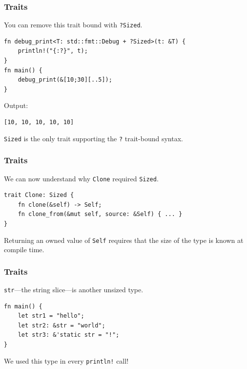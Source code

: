 \begin{frame}[fragile]
    \frametitle{Traits}
    You can remove this trait bound with \texttt{?Sized}.
    \pause
    \vfill
    \begin{verbatim}
fn debug_print<T: std::fmt::Debug + ?Sized>(t: &T) {
    println!("{:?}", t);
}
fn main() {
    debug_print(&[10;30][..5]);
}
    \end{verbatim}
    \vfill
    Output:
    \pause
    \begin{verbatim}
[10, 10, 10, 10, 10]
    \end{verbatim}
    \pause
    \vfill
    \texttt{Sized} is the only trait supporting the \texttt{?} trait-bound syntax.
\end{frame}

\begin{frame}[fragile]
    \frametitle{Traits}
    We can now understand why \texttt{Clone} required \texttt{Sized}.
    \pause
    \vfill
    \begin{verbatim}
trait Clone: Sized {
    fn clone(&self) -> Self;
    fn clone_from(&mut self, source: &Self) { ... }
}
    \end{verbatim}
    \pause
    \vfill
    Returning an owned value of \texttt{Self} requires that the size of the type is known at compile time.
\end{frame}

\begin{frame}[fragile]
    \frametitle{Traits}
    \texttt{str}---the string slice---is another unsized type.
    \pause
    \vfill
    \begin{verbatim}
fn main() {
    let str1 = "hello";
    let str2: &str = "world";
    let str3: &'static str = "!";
}
    \end{verbatim}
    \pause
    \vfill
    We used this type in every \texttt{println!} call!
\end{frame}


